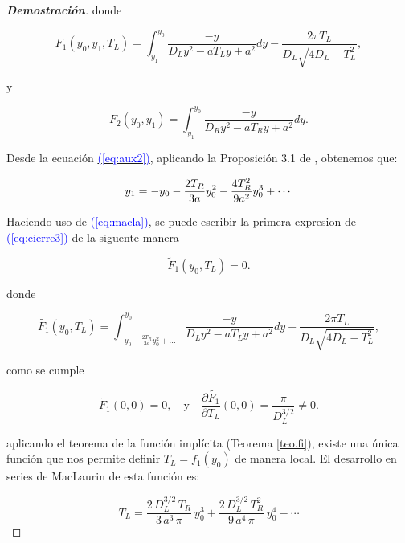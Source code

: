\documentclass[12pt,a4paper]{report} %
\newcommand{\eref}[1]{\hyperref[#1]{\textcolor{blue}{(\ref*{#1})}}}
\begin{document}
\begin{proof}[\textbf{Demostración}]
	\noindent donde
	
	\begin{equation}
		\label{eq:aux1}
		F_1(y_0,y_1,T_L)=\int_{y_1}^{y_0}\frac{-y}{D_Ly^2-aT_Ly+a^2}dy-\frac{2\pi T_L}{D_L\sqrt{4D_L-T_L^2}},
	\end{equation}\smallskip
	
	\noindent y
	
	\begin{equation}
		\label{eq:aux2}
		F_2(y_0,y_1)=\int_{y_1}^{y_0}\frac{-y}{D_Ry^2-aT_Ry+a^2}dy.
	\end{equation}\smallskip
	
	\noindent Desde la ecuación \eref{eq:aux2}, aplicando la Proposición 3.1 de \cite{properties}, obtenemos que:
	
		\begin{equation}
		\label{eq:macla}
		\scalebox{1}{$\displaystyle
			y_1=-y_0-\frac{2T_R}{3a}y_0^2-\frac{4T_R^2}{9a^2}y_0^3+\cdots
			$}
	\end{equation}\smallskip
	
	\noindent Haciendo uso de \eref{eq:macla}, se puede escribir la primera expresion de \eref{eq:cierre3} de la siguente manera
	
	\begin{equation}
		\label{eq:f1nuevo}
		\tilde{F}_1(y_0,T_L)=0.
	\end{equation}\smallskip
	
	\noindent donde
	
	\begin{equation}
		\label{eq:macla2}
				\tilde{F_1}(y_0,T_L)=\int_{-y_0-\frac{2T_R}{3a}y_0^2+...}^{y_0}\frac{-y}{D_Ly^2-aT_Ly+a^2}dy-\frac{2\pi T_L}{D_L\sqrt{4D_L-T_L^2}},
	\end{equation}\smallskip

	\noindent como se cumple
	
	\begin{equation}
		\label{dpar}
		\tilde{F_1}(0,0)=0, \quad \text{y}\quad\frac{\partial \tilde{F_1}}{\partial T_L}(0,0)=\frac{\pi}{D_L^{3/2}}\neq0.
	\end{equation}\smallskip
	
	\noindent aplicando el teorema de la función implícita (Teorema \ref{teo.fi}), existe una única función que nos permite definir $T_L=f_1(y_0)$ de manera local. El desarrollo en series de MacLaurin de esta función es:
	
	\begin{equation}
		\label{macla3}
		T_L=\frac{2\, D_L^{3/2}\, T_R}{3\, a^3 \, \pi}\: y_0^3+\frac{2\, D_L^{3/2}\, T_R^2}{9\, a^4 \, \pi}\: y_0^4-\cdots
	\end{equation}\smallskip
	

\end{proof}
\end{document}
